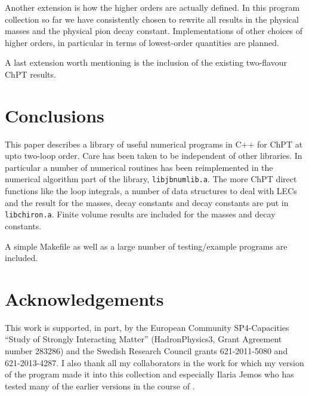 \documentclass[12pt,a4paper]{article}
\begin{document}
Another extension is how the higher orders are actually defined. In this
program collection so far we have consistently chosen to rewrite all results
in the physical masses and the physical pion decay constant. 
Implementations of other choices of higher orders, in
particular in terms of lowest-order quantities are planned.

A last extension worth mentioning is the inclusion of the existing
two-flavour ChPT results.

\section{Conclusions}
\label{conclusions}

This paper describes a library of useful numerical programs in \textsc{C++}
for ChPT at upto two-loop order. Care has been taken to be independent
of other libraries. In particular a number of numerical routines has
been reimplemented in the numerical algorithm part of the library,
\texttt{libjbnumlib.a}. The more ChPT direct functions like the
loop integrals, a number of data structures to deal with LECs and
the result for the masses, decay constants and decay constants
are put in \texttt{libchiron.a}. Finite volume results
are included for the masses and decay constants.

A simple Makefile as well as a large number of testing/example programs are
included.

\section*{Acknowledgements}

This work is supported, in part, by the European Community SP4-Capacities
``Study of Strongly Interacting Matter'' (HadronPhysics3,
Grant Agreement number 283286) and
the Swedish Research Council grants 621-2011-5080 and 621-2013-4287.
I also thank all my collaborators in the work for which my version
of the program made it into this collection and especially
Ilaria Jemos who has tested many of the earlier versions
in the course of \cite{Bijnens:2011tb}.
\end{document}
